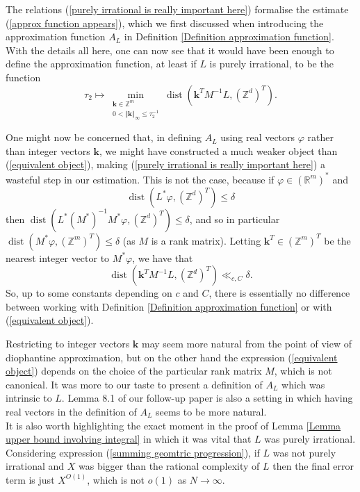 \documentclass[12pt,a4paper,twoside,reqno]{amsart}
\newcommand{\dist}{\operatorname{dist}}
\numberwithin{equation}{section}
\begin{document}
The relations (\ref{purely irrational is really important here}) formalise the estimate (\ref{approx function appears}), which we first discussed when introducing the approximation function $A_L$ in Definition \ref{Definition approximation function}. With the details all here, one can now see that it would have been enough to define the approximation function, at least if $L$ is purely irrational, to be the function \begin{equation}
\label{equivalent object}
 \tau_2 \mapsto \min\limits_{\substack{ \mathbf{k} \in \mathbb{Z}^m \\ 0< \Vert \mathbf{k}\Vert_\infty \leqslant \tau_2^{-1}}} \dist(\mathbf{k}^T M^{-1} L, (\mathbb{Z}^d)^T).
 \end{equation} 
 
One might now be concerned that, in defining $A_L$ using real vectors $\varphi$ rather than integer vectors $\mathbf{k}$, we might have constructed a much weaker object than (\ref{equivalent object}), making (\ref{purely irrational is really important here}) a wasteful step in our estimation. This is not the case, because if $\varphi \in (\mathbb{R}^m)^*$ and\[\dist(L^* \varphi, (\mathbb{Z}^d)^T) \leqslant \delta\] then $\dist(L^*(M^*)^{-1} M^* \varphi, (\mathbb{Z}^d)^T) \leqslant \delta$, and so in particular $\dist (M^* \varphi , (\mathbb{Z}^m)^T) \leqslant \delta$ (as $M$ is a rank matrix). Letting $\mathbf{k}^T \in (\mathbb{Z}^m)^T$ be the nearest integer vector to $M^*\varphi$, we have that \[\dist (\mathbf{k}^T M^{-1} L, (\mathbb{Z}^d)^T) \ll_{c,C} \delta.\] So, up to some constants depending on $c$ and $C$, there is essentially no difference between working with Definition \ref{Definition approximation function} or with (\ref{equivalent object}).

Restricting to integer vectors $\mathbf{k}$ may seem more natural from the point of view of diophantine approximation, but on the other hand the expression (\ref{equivalent object}) depends on the choice of the particular rank matrix $M$, which is not canonical. It was more to our taste to present a definition of $A_L$ which was intrinsic to $L$. Lemma 8.1 of our follow-up paper \cite{Wa19} is also a setting in which having real vectors in the definition of $A_L$ seems to be more natural.\\

It is also worth highlighting the exact moment in the proof of Lemma \ref{Lemma upper bound involving integral} in which it was vital that $L$ was purely irrational. Considering expression (\ref{summing geomtric progression}), if $L$ was not purely irrational and $X$ was bigger than the rational complexity of $L$ then the final error term is just $X^{O(1)}$, which is not $o(1)$ as $N\rightarrow \infty$. \\
\end{document}
